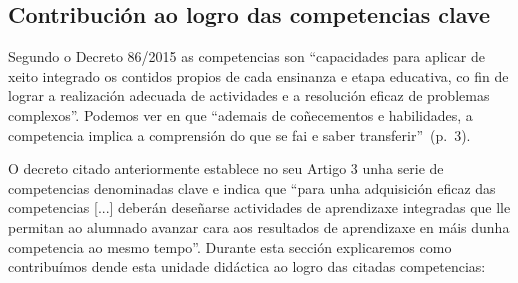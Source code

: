 \subsection{Contribución ao logro das competencias clave}\label{sec:competencias}
Segundo o Decreto 86/2015 as competencias son ``capacidades para aplicar de xeito integrado os contidos propios de cada ensinanza e etapa educativa, co fin de lograr a realización adecuada de actividades e a resolución eficaz de problemas complexos''. Podemos ver en  que ``ademais de coñecementos e habilidades, a competencia implica a comprensión do que se fai e saber transferir''~(p.~3).

O decreto citado anteriormente establece no seu Artigo 3 unha serie de competencias denominadas clave e indica que ``para unha adquisición eficaz das competencias [...] deberán deseñarse actividades de aprendizaxe integradas que lle permitan ao alumnado avanzar cara aos resultados de aprendizaxe en máis dunha competencia ao mesmo tempo''. Durante esta sección explicaremos como contribuímos dende esta unidade didáctica ao logro das citadas competencias:

